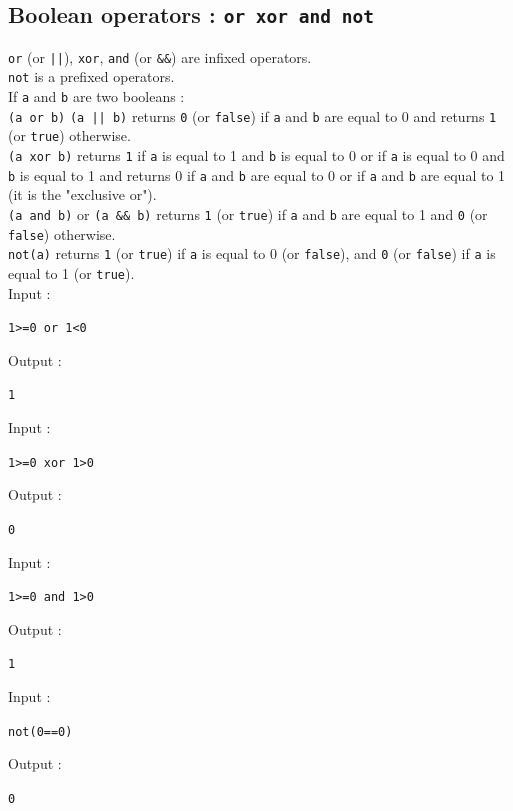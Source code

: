 \documentclass[a4paper,11pt]{book}
\begin{document}
\subsection{Boolean operators  : {\tt or xor and not}}\index{$\bigparallel$}
{\tt or} (or {\tt ||}), {\tt xor}, {\tt and} (or {\tt \&\&})  are infixed 
operators.\\
{\tt not} is a prefixed operators.\\ 
If {\tt a} and {\tt b} are two booleans :\\
{\tt (a or b)}  {\tt (a || b)} returns  {\tt 0} (or {\tt false}) if {\tt a} and
{\tt b} are equal to 0  and returns {\tt 1} (or {\tt true}) otherwise.\\ 
{\tt (a xor b)}   returns {\tt 1} if {\tt a} is equal to 1 and {\tt b} is
equal to 0 or if {\tt a} is equal to 0 and {\tt b} is equal to 1  and  returns 0
 if {\tt a} and {\tt b} are equal to 0
 or if  {\tt a} and {\tt b}  are equal to 1 (it is the "exclusive or").\\ 
{\tt (a and b)} or {\tt (a \&\& b)}  returns {\tt 1} (or {\tt true}) if {\tt a}
 and {\tt b}  are equal to 1 and {\tt 0} (or {\tt false})  otherwise.\\
{\tt not(a)} returns {\tt 1} (or {\tt true}) if {\tt a}  is equal to 0 (or 
{\tt false}), and {\tt 0} (or {\tt false})  if {\tt a}  is equal to 1 (or 
{\tt true}).\\ 
Input :
\begin{center}{\tt 1>=0 or 1<0}\end{center}
Output :
\begin{center}{\tt 1}\end{center}
Input :
\begin{center}{\tt 1>=0 xor 1>0}\end{center}
Output :
\begin{center}{\tt 0}\end{center}
Input :
\begin{center}{\tt 1>=0 and 1>0}\end{center}
Output :
\begin{center}{\tt 1}\end{center}
Input :
\begin{center}{\tt not(0==0)}\end{center}
Output :
\begin{center}{\tt 0}\end{center}
\end{document}
